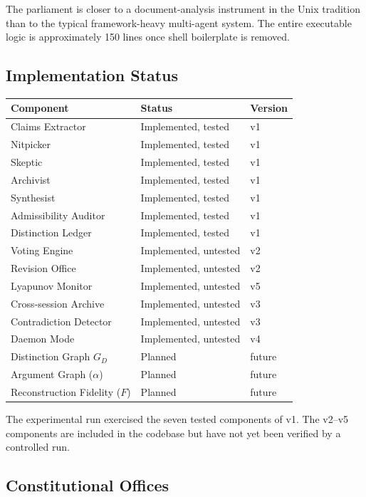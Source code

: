 \documentclass[12pt, a4paper]{article}
\theoremstyle{principle}
\theoremstyle{definition}
\begin{document}
The parliament is closer to a document-analysis instrument in the Unix tradition
than to the typical framework-heavy multi-agent system. The entire executable logic
is approximately 150 lines once shell boilerplate is removed.

\subsection{Implementation Status}

\begin{center}
\begin{tabular}{lll}
\toprule
Component & Status & Version \\
\midrule
Claims Extractor       & Implemented, tested   & v1 \\
Nitpicker              & Implemented, tested   & v1 \\
Skeptic                & Implemented, tested   & v1 \\
Archivist              & Implemented, tested   & v1 \\
Synthesist             & Implemented, tested   & v1 \\
Admissibility Auditor  & Implemented, tested   & v1 \\
Distinction Ledger     & Implemented, tested   & v1 \\
Voting Engine          & Implemented, untested & v2 \\
Revision Office        & Implemented, untested & v2 \\
Lyapunov Monitor       & Implemented, untested & v5 \\
Cross-session Archive  & Implemented, untested & v3 \\
Contradiction Detector & Implemented, untested & v3 \\
Daemon Mode            & Implemented, untested & v4 \\
Distinction Graph $G_D$     & Planned & future \\
Argument Graph ($\alpha$)   & Planned & future \\
Reconstruction Fidelity ($F$) & Planned & future \\
\bottomrule
\end{tabular}
\end{center}

The experimental run exercised the seven tested components of v1. The v2--v5
components are included in the codebase but have not yet been verified by a
controlled run.

\subsection{Constitutional Offices}
\end{document}
